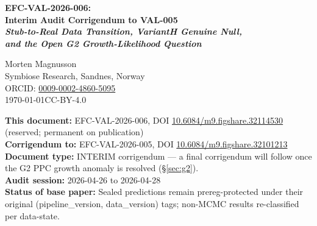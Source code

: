 \documentclass[11pt]{article}
\begin{document}
\begin{center}
{\LARGE\bfseries\color{eblue}
EFC-VAL-2026-006:\\[2pt]
Interim Audit Corrigendum to VAL-005\\[4pt]
\textit{Stub-to-Real Data Transition, VariantH Genuine Null,\\
and the Open G2 Growth-Likelihood Question}}

\vspace{8pt}
{\large Morten Magnusson}\\[2pt]
{\small Symbiose Research, Sandnes, Norway\\
ORCID: \href{https://orcid.org/0009-0002-4860-5095}{0009-0002-4860-5095}\\
\today \quad CC-BY-4.0}

\vspace{6pt}
\textbf{This document:} EFC-VAL-2026-006, DOI
\href{https://doi.org/10.6084/m9.figshare.32114530}{10.6084/m9.figshare.32114530}
(reserved; permanent on publication)\\
\textbf{Corrigendum to:} EFC-VAL-2026-005, DOI
\href{https://doi.org/10.6084/m9.figshare.32101213}{10.6084/m9.figshare.32101213}\\
\textbf{Document type:} \textcolor{ered}{INTERIM} corrigendum --- a final corrigendum will follow once the G2 PPC growth anomaly is resolved (\S\ref{sec:g2}).\\
\textbf{Audit session:} 2026-04-26 to 2026-04-28\\
\textbf{Status of base paper:} Sealed predictions remain prereg-protected under their original (pipeline\_version, data\_version) tags; non-MCMC results re-classified per data-state.
\end{center}
\end{document}
